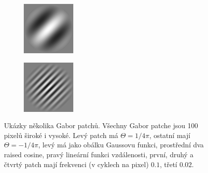 \begin{figure}[h!]
\begin{subfigure}{0.25\textwidth}
  \includegraphics[width=.8\linewidth]{img/gabor3}
\end{subfigure}%
\begin{subfigure}{0.25\textwidth}
  \centering
  \includegraphics[width=.8\linewidth]{img/gabor4}
\end{subfigure}%

\caption{Ukázky několika Gabor patchů. Všechny Gabor patche jsou 100 pixelů
široké i vysoké. Levý patch má $\Theta = 1/4\pi$, ostatní mají $\Theta =
-1/4\pi$, levý má jako obálku Gaussovu funkci, prostřední dva raised cosine,
pravý lineární funkci vzdálenosti, první, druhý a čtvrtý patch mají frekvenci (v
cyklech na pixel) $0.1$, třetí $0.02$.} 

\label{obr:gabor:example} 
 
\end{figure}


